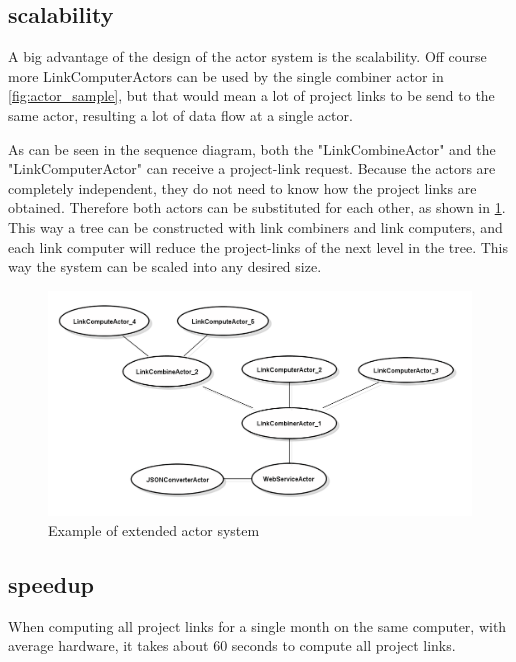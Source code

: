 \documentclass[10pt,a4paper]{article}
\begin{document}

\subsection{scalability}

A big advantage of the design of the actor system is the scalability. Off course more LinkComputerActors can be used by the single combiner actor in \ref{fig:actor_sample}, but that would mean a lot of project links to be send to the same actor, resulting a lot of data flow at a single actor. 

As can be seen in the sequence diagram, both the "LinkCombineActor" and the "LinkComputerActor" can receive a project-link request. Because the actors are completely independent, they do not need to know how the project links are obtained. Therefore both actors can be substituted for each other, as shown in  \ref{fig:example_scalable}. This way a tree can be constructed with link combiners and link computers, and each link computer will reduce the project-links of the next level in the tree. This way the system can be scaled into any desired size.

\begin{figure}[htb]
    \centering
    \includegraphics[width=1.00\textwidth]{ActorSystemSampleExtended}
    \caption{Example of extended actor system}
    \label{fig:example_scalable}
\end{figure}

\subsection{speedup}

When computing all project links for a single month on the same computer, with average hardware, it takes about 60 seconds to compute all project links. 
\end{document}
